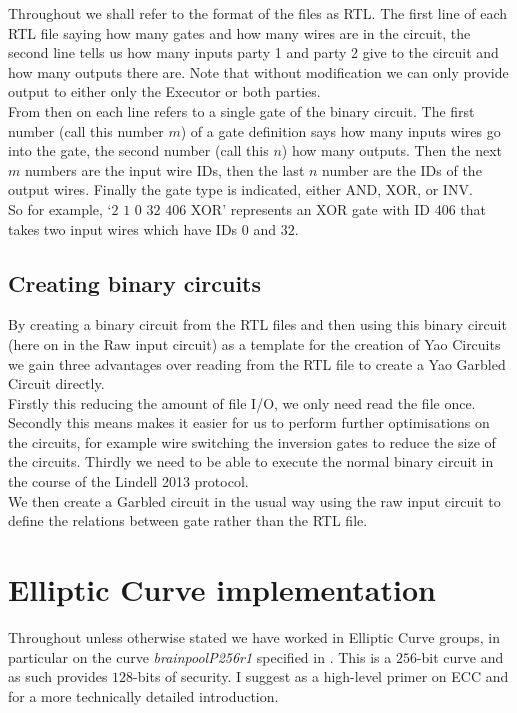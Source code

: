 \documentclass[ %
                    author={Nicholas Tutte},
                supervisor={Prof. Nigel Smart},
                    degree={MEng},
                     title={Secure Two Party Computation},
                  subtitle={A practical comparison of recent protocols},
                      type={Research - GG1K},
                      year={2015} ]{dissertation}
\begin{document}
				Throughout we shall refer to the format of the files as RTL. The first line of each RTL file saying how many gates and how many wires are in the circuit, the second line tells us how many inputs party 1 and party 2 give to the circuit and how many outputs there are. Note that without modification we can only provide output to either only the Executor or both parties.\\

				From then on each line refers to a single gate of the binary circuit. The first number (call this number $m$) of a gate definition says how many inputs wires go into the gate, the second number (call this $n$) how many outputs. Then the next $m$ numbers are the input wire IDs, then the last $n$ number are the IDs of the output wires. Finally the gate type is indicated, either AND, XOR, or INV.\\

				So for example, `$2$ $1$ $0$ $32$ $406$ XOR' represents an XOR gate with ID $406$ that takes two input wires which have IDs $0$ and $32$.

			\subsection{Creating binary circuits}
				By creating a binary circuit from the RTL files and then using this binary circuit (here on in the Raw input circuit) as a template for the creation of Yao Circuits we gain three advantages over reading from the RTL file to create a Yao Garbled Circuit directly.\\

				Firstly this reducing the amount of file I/O, we only need read the file once. Secondly this means makes it easier for us to perform further optimisations on the circuits, for example wire switching the inversion gates to reduce the size of the circuits. Thirdly we need to be able to execute the normal binary circuit in the course of the Lindell 2013 protocol.\\

				We then create a Garbled circuit in the usual way using the raw input circuit to define the relations between gate rather than the RTL file.

		\section{Elliptic Curve implementation}

			Throughout unless otherwise stated we have worked in Elliptic Curve groups, in particular on the curve \emph{brainpoolP256r1} specified in \cite{BrainpoolSpecifications}. This is a $256$-bit curve and as such provides $128$-bits of security. I suggest \cite{ECC_Primer} as a high-level primer on ECC and \cite{ECC_RFC_6090} for a more technically detailed introduction.\\
\end{document}
